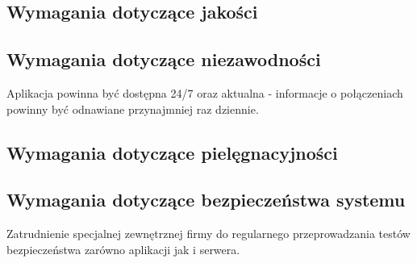 \documentclass[12pt,a4paper]{report}
\begin{document}
\subsection{Wymagania dotyczące jakości}
\subsection{Wymagania dotyczące niezawodności}
	Aplikacja powinna być dostępna 24/7 oraz aktualna - informacje o połączeniach powinny być odnawiane przynajmniej raz dziennie.
\subsection{Wymagania dotyczące pielęgnacyjności}
	
\subsection{Wymagania dotyczące bezpieczeństwa systemu}
	Zatrudnienie specjalnej zewnętrznej firmy do regularnego przeprowadzania testów bezpieczeństwa zarówno aplikacji jak i serwera. 
\end{document}
